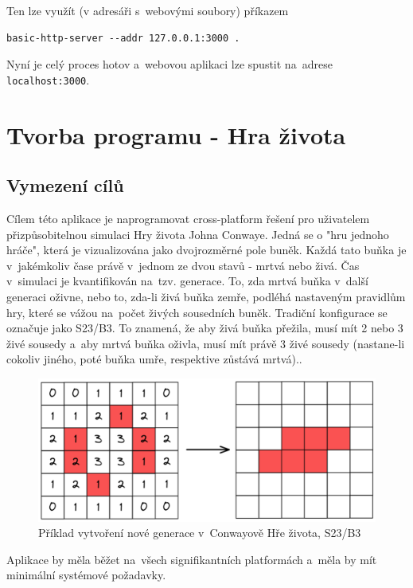 \documentclass[a4paper, 12pt, twoside]{article} %
\begin{document}
		Ten lze využít (v adresáři s~webovými soubory) příkazem
		\begin{verbatim}
basic-http-server --addr 127.0.0.1:3000 .
		\end{verbatim}
		
		Nyní je celý proces hotov a~webovou aplikaci lze spustit na~adrese \linebreak\texttt{localhost:3000}.\cite{wasm_vid, wasm_gh}


\section{Tvorba programu - Hra života}
	\subsection{Vymezení cílů}
		Cílem této aplikace je naprogramovat cross-platform řešení pro uživatelem přizpůsobitelnou simulaci Hry života Johna Conwaye. Jedná se o "hru jednoho hráče", která je vizualizována jako dvojrozměrné pole buněk. Každá tato buňka je v~jakémkoliv čase právě v~jednom ze dvou stavů - mrtvá nebo živá. Čas v~simulaci je kvantifikován na~tzv. generace. To, zda mrtvá buňka v~další generaci oživne, nebo to, zda-li živá buňka zemře, podléhá nastaveným pravidlům hry, které se vážou na~počet živých sousedních buněk. Tradiční konfigurace se označuje jako S23/B3. To znamená, že aby živá buňka přežila, musí mít 2 nebo 3 živé sousedy a~aby mrtvá buňka oživla, musí mít právě 3 živé sousedy (nastane-li cokoliv jiného, poté buňka umře, respektive zůstává mrtvá).\cite{conway}.
		\begin{center}
			\begin{figure}[H]
				\centering
				\includegraphics[width=.82\linewidth]{conway}
				\caption{Příklad vytvoření nové generace v~Conwayově Hře života, S23/B3}
				\label{fig:conway}
			\end{figure}
		\end{center}
	
		Aplikace by měla běžet na~všech signifikantních platformách a~měla by mít minimální systémové požadavky.
	
\end{document}
